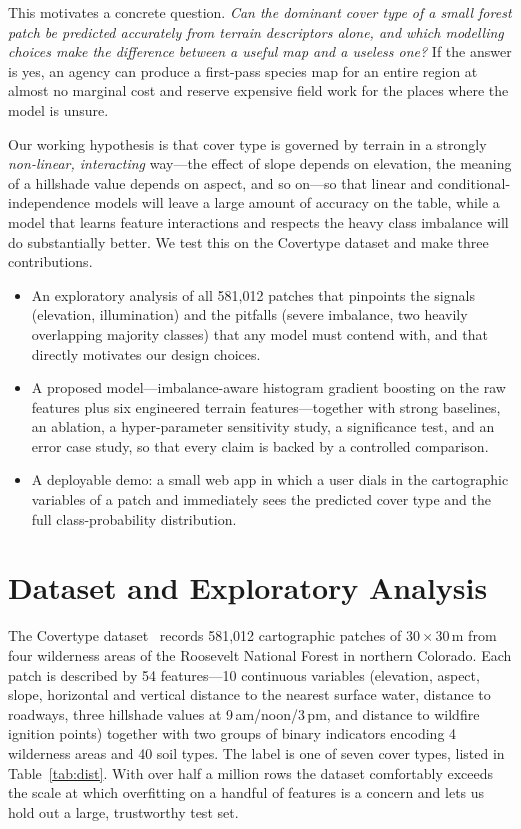 \documentclass[sigconf,nonacm]{acmart}
\begin{document}
This motivates a concrete question. \emph{Can the dominant cover type of a small
forest patch be predicted accurately from terrain descriptors alone, and which
modelling choices make the difference between a useful map and a useless one?}
If the answer is yes, an agency can produce a first-pass species map for an
entire region at almost no marginal cost and reserve expensive field work for
the places where the model is unsure.

Our working hypothesis is that cover type is governed by terrain in a strongly
\emph{non-linear, interacting} way---the effect of slope depends on elevation,
the meaning of a hillshade value depends on aspect, and so on---so that linear
and conditional-independence models will leave a large amount of accuracy on the
table, while a model that learns feature interactions and respects the heavy
class imbalance will do substantially better. We test this on the Covertype
dataset and make three contributions.

\begin{itemize}
\item An exploratory analysis of all 581{,}012 patches that pinpoints the
signals (elevation, illumination) and the pitfalls (severe imbalance, two
heavily overlapping majority classes) that any model must contend with, and that
directly motivates our design choices.
\item A proposed model---imbalance-aware histogram gradient boosting on the raw
features plus six engineered terrain features---together with strong baselines,
an ablation, a hyper-parameter sensitivity study, a significance test, and an
error case study, so that every claim is backed by a controlled comparison.
\item A deployable demo: a small web app in which a user dials in the
cartographic variables of a patch and immediately sees the predicted cover type
and the full class-probability distribution.
\end{itemize}

\section{Dataset and Exploratory Analysis}
\label{sec:data}
The Covertype dataset~\cite{blackard1999,uci} records 581{,}012 cartographic
patches of $30\times30$\,m from four wilderness areas of the Roosevelt National
Forest in northern Colorado. Each patch is described by 54 features---10
continuous variables (elevation, aspect, slope, horizontal and vertical
distance to the nearest surface water, distance to roadways, three hillshade
values at 9\,am/noon/3\,pm, and distance to wildfire ignition points) together
with two groups of binary indicators encoding 4 wilderness areas and 40 soil
types. The label is one of seven cover types, listed in Table~\ref{tab:dist}.
With over half a million rows the dataset comfortably exceeds the scale at which
overfitting on a handful of features is a concern and lets us hold out a large,
trustworthy test set.
\end{document}
